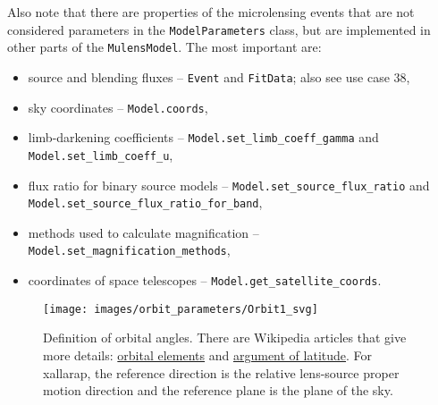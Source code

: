 \documentclass[12pt]{article}
\begin{document}
Also note that there are properties of the microlensing events that are not considered parameters in the \texttt{ModelParameters} class, but are implemented in other parts of the \texttt{MulensModel}. The most important are:
\begin{itemize}
 \item source and blending fluxes -- \texttt{Event} and \texttt{FitData}; also see use case 38,
 \item sky coordinates -- \texttt{Model.coords},
 \item limb-darkening coefficients -- \texttt{Model.set\_limb\_coeff\_gamma} and \texttt{Model.set\_limb\_coeff\_u},
 \item flux ratio for binary source models -- \texttt{Model.set\_source\_flux\_ratio} and\\ \texttt{Model.set\_source\_flux\_ratio\_for\_band},
 \item methods used to calculate magnification -- \texttt{Model.set\_magnification\_methods},
 \item coordinates of space telescopes -- \texttt{Model.get\_satellite\_coords}.
\end{itemize}

\begin{figure}
\centering
\texttt{[image: images/orbit\_parameters/Orbit1\_svg]}
\caption{
Definition of orbital angles. 
There are Wikipedia articles that give more details: 
\href{https://en.wikipedia.org/wiki/Orbital_elements}{orbital elements} and 
\href{https://en.wikipedia.org/wiki/Argument_of_latitude}{argument of latitude}.
For xallarap, the reference direction is the relative lens-source proper motion direction and the reference plane is the plane of the sky. 
}
\end{figure}
\end{document}
